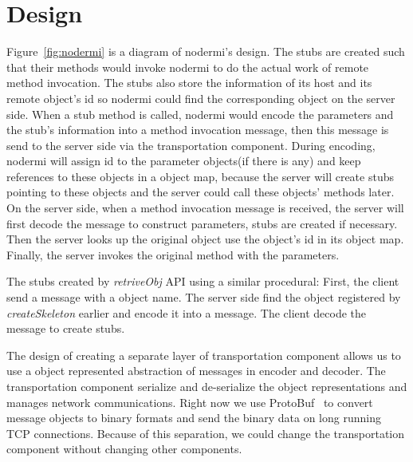 \nodermifig{}

\section{Design}
Figure~\ref{fig:nodermi} is a diagram of nodermi's design.
The stubs are created such that their methods would invoke nodermi to do
the actual work of remote method invocation.
The stubs also store the information of its host and its remote object's id
so nodermi could find the corresponding object on the server side.
When a stub method is called,
nodermi would encode the parameters and the stub's information into a method invocation
message,
then this message is send to the server side via the transportation component.
During encoding, nodermi will assign id to the parameter objects(if there is any) and
 keep references to these objects in a object map,
because the server will create stubs pointing to these objects and the
server could call these objects' methods later.
On the server side, when a method invocation message is received,
the server will first decode the message to construct parameters,
stubs are created if necessary.
Then the server looks up the original object use the object's id in its object map.
Finally, the server invokes the original method with the parameters.

The stubs created by \emph{retriveObj} API using a similar procedural:
First, the client send a message with a object name.
The server side find the object registered by \emph{createSkeleton} earlier and
encode it into a message. The client decode the message to create stubs.

The design of creating a separate layer of transportation component allows
us to use a object represented abstraction of messages in encoder and decoder.
The transportation component serialize and de-serialize the object representations
and manages network communications.
Right now we use ProtoBuf~\cite{protobuf} to convert message objects to binary
formats and send the binary data on long running TCP connections.
Because of this separation, we could change the transportation component without
changing other components.


\nodrmimethodinvokefig{}
\nodrmicallbackfig{}

